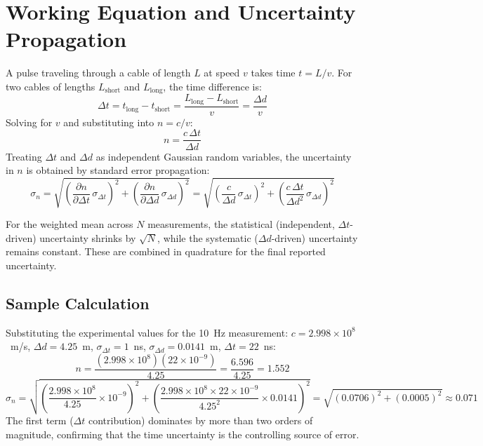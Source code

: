 \documentclass[12pt]{article}
\begin{document}
\newpage

\section{Working Equation and Uncertainty Propagation}

A pulse traveling through a cable of length $L$ at speed $v$ takes time $t = L/v$. For two cables of lengths $L_{\text{short}}$ and $L_{\text{long}}$, the time difference is:
\begin{equation}
\Delta t = t_{\text{long}} - t_{\text{short}} = \frac{L_{\text{long}} - L_{\text{short}}}{v} = \frac{\Delta d}{v}
\label{eq:dt}
\end{equation}
Solving for $v$ and substituting into $n = c/v$:
\begin{equation}
n = \frac{c\,\Delta t}{\Delta d}
\label{eq:working_app}
\end{equation}
Treating $\Delta t$ and $\Delta d$ as independent Gaussian random variables, the uncertainty in $n$ is obtained by standard error propagation:
\begin{equation}
\sigma_n = \sqrt{\left(\frac{\partial n}{\partial \Delta t}\,\sigma_{\Delta t}\right)^{\!2} + \left(\frac{\partial n}{\partial \Delta d}\,\sigma_{\Delta d}\right)^{\!2}}
= \sqrt{\left(\frac{c}{\Delta d}\,\sigma_{\Delta t}\right)^{\!2} + \left(\frac{c\,\Delta t}{\Delta d^2}\,\sigma_{\Delta d}\right)^{\!2}}
\label{eq:sigma_n}
\end{equation}

For the weighted mean across $N$ measurements, the statistical (independent, $\Delta t$-driven) uncertainty shrinks by $\sqrt{N}$, while the systematic ($\Delta d$-driven) uncertainty remains constant. These are combined in quadrature for the final reported uncertainty.

\subsection*{Sample Calculation}

Substituting the experimental values for the 10~Hz measurement: $c = 2.998 \times 10^8$~m/s, $\Delta d = 4.25$~m, $\sigma_{\Delta t} = 1$~ns, $\sigma_{\Delta d} = 0.0141$~m, $\Delta t = 22$~ns:
\[
n = \frac{(2.998 \times 10^8)(22 \times 10^{-9})}{4.25} = \frac{6.596}{4.25} = 1.552
\]
\[
\sigma_n = \sqrt{\left(\frac{2.998 \times 10^8}{4.25} \times 10^{-9}\right)^{\!2} + \left(\frac{2.998 \times 10^8 \times 22 \times 10^{-9}}{4.25^2} \times 0.0141\right)^{\!2}} = \sqrt{(0.0706)^2 + (0.0005)^2} \approx 0.071
\]
The first term ($\Delta t$ contribution) dominates by more than two orders of magnitude, confirming that the time uncertainty is the controlling source of error.
\end{document}
